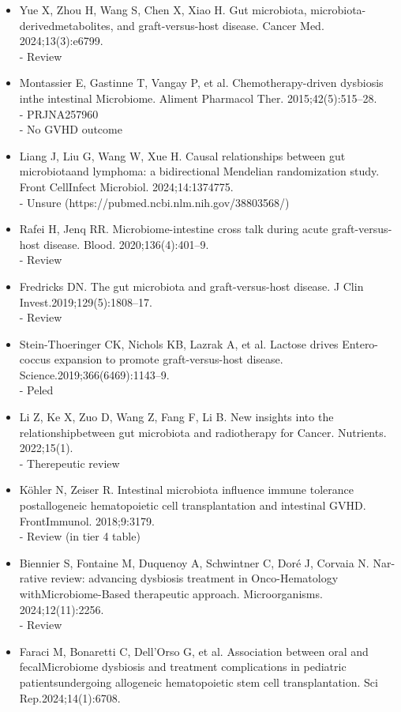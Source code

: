 \documentclass[11pt,a4paper]{article}
\begin{document}
\begin{itemize}
    \item  Yue X, Zhou H, Wang S, Chen X, Xiao H. Gut microbiota, microbiota-derivedmetabolites, and graft-versus-host disease. Cancer Med. 2024;13(3):e6799.\\
    - Review
    \item  Montassier E, Gastinne T, Vangay P, et al. Chemotherapy-driven dysbiosis inthe intestinal Microbiome. Aliment Pharmacol Ther. 2015;42(5):515–28.\\
    - PRJNA257960\\
    - No GVHD outcome
    \item  Liang J, Liu G, Wang W, Xue H. Causal relationships between gut microbiotaand lymphoma: a bidirectional Mendelian randomization study. Front CellInfect Microbiol. 2024;14:1374775.\\
    - Unsure (https://pubmed.ncbi.nlm.nih.gov/38803568/)
    \item Rafei H, Jenq RR. Microbiome-intestine cross talk during acute graft-versus-host disease. Blood. 2020;136(4):401–9.\\
    - Review
    \item  Fredricks DN. The gut microbiota and graft-versus-host disease. J Clin Invest.2019;129(5):1808–17.\\
    - Review
    \item  Stein-Thoeringer CK, Nichols KB, Lazrak A, et al. Lactose drives Entero-coccus expansion to promote graft-versus-host disease. Science.2019;366(6469):1143–9.\\
    - Peled
    \item Li Z, Ke X, Zuo D, Wang Z, Fang F, Li B. New insights into the relationshipbetween gut microbiota and radiotherapy for Cancer. Nutrients. 2022;15(1).\\
    - Therepeutic review
    \item  Köhler N, Zeiser R. Intestinal microbiota influence immune tolerance postallogeneic hematopoietic cell transplantation and intestinal GVHD. FrontImmunol. 2018;9:3179.\\
    - Review (in tier 4 table)
    \item  Biennier S, Fontaine M, Duquenoy A, Schwintner C, Doré J, Corvaia N. Nar-rative review: advancing dysbiosis treatment in Onco-Hematology withMicrobiome-Based therapeutic approach. Microorganisms. 2024;12(11):2256.\\
    - Review
    \item  Faraci M, Bonaretti C, Dell’Orso G, et al. Association between oral and fecalMicrobiome dysbiosis and treatment complications in pediatric patientsundergoing allogeneic hematopoietic stem cell transplantation. Sci Rep.2024;14(1):6708.\\

\end{itemize}
\end{document}
